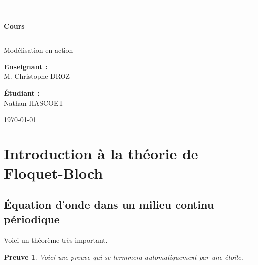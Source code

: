 \documentclass[12pt,a4paper]{article}
\theoremstyle{plain}
\newtheorem{dem}{Preuve}[section]
\begin{document}
	
	\begin{titlepage}
		\centering
		
		\begin{figure}[h]
			\centering
		\end{figure}
		
		\vspace{2cm}
		
		\rule{\linewidth}{0.5mm} \\[0.4cm]
		
		{\color{bleuTitre} \Huge \bfseries Cours} \\[0.4cm]
		
		\rule{\linewidth}{0.5mm}
		
		\vspace{1.5cm}
		
		{\Large Modélisation en action}
		
		\vfill
		
		\begin{minipage}{0.45\textwidth}
			\begin{flushleft} \large
				\textbf{Enseignant :} \\
				M. Christophe \textsc{DROZ}
			\end{flushleft}
		\end{minipage}
		\hfill
		\begin{minipage}{0.45\textwidth}
			\begin{flushright} \large
				\textbf{Étudiant :} \\
				Nathan \textsc{HASCOET}
			\end{flushright}
		\end{minipage}
		
		\vspace{2cm}
		
		{\large \today}
		
	\end{titlepage}
	
	\section{Introduction à la théorie de Floquet-Bloch}
	\subsection{Équation d'onde dans un milieu continu périodique}
	
	\begin{thm}
		Voici un théorème très important.
	\end{thm}
	
	\begin{dem}
		Voici une preuve qui se terminera automatiquement par une étoile.
	\end{dem}
	
\end{document}
